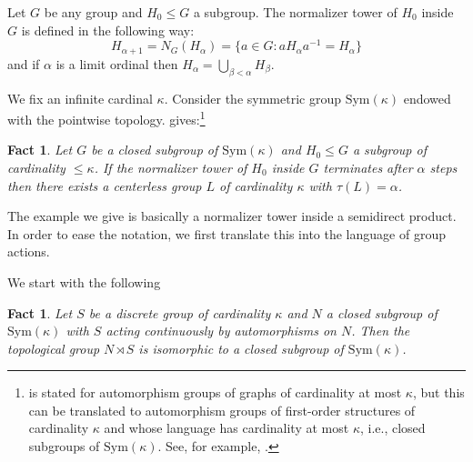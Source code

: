 \documentclass[10pt,a4paper]{amsart}
\theoremstyle{plain}
\newtheorem{fact}[theorem]{Fact}
\theoremstyle{definition}
\newcounter{step}
\begin{document}
Let $G$ be any group and $H_0\leq G$ a subgroup. The normalizer tower of $H_0$ inside $G$ is defined in the following way: \[H_{\alpha+1}=N_G(H_\alpha)=\{a\in G: aH_\alpha a^{-1}=H_\alpha\}\] and if $\alpha$ is a limit ordinal then $H_\alpha=\bigcup_{\beta<\alpha} H_\beta$. 

We fix an infinite cardinal $\kappa$. Consider the symmetric group $\mathrm{Sym}(\kappa)$ endowed with the pointwise topology. 
\cite[Lemma 1.8]{JuShTh} gives:\footnote{\cite[Lemma 1.8]{JuShTh} is stated for automorphism groups of graphs of cardinality at most $\kappa$, but this can be translated to automorphism groups of first-order structures of cardinality $\kappa$ and whose language has cardinality at most $\kappa$, i.e., closed subgroups of $\mathrm{Sym}(\kappa)$. See, for example, \cite[Theorem 4.1.9]{ThomasBook}.}

\begin{fact}\label{F: normalizer to automorphism}
Let $G$ be a closed subgroup of $\mathrm{Sym}(\kappa)$ and $H_0\leq G$ a subgroup of cardinality $\leq \kappa$. If the normalizer tower of $H_0$ inside $G$ terminates after $\alpha$ steps then there exists a  centerless group $L$ of cardinality $\kappa$ with $\tau(L)=\alpha$. 
\end{fact}


The example we give is basically a normalizer tower inside a semidirect product. In order to ease the notation, we first translate this into the language of group actions. 

We start with the following
\begin{fact}\label{F:semidirect of nonarchPolish}
    Let $S$ be a discrete group of cardinality $\kappa$ and $N$ a closed subgroup of $\mathrm{Sym}(\kappa)$ with $S$ acting continuously by automorphisms on $N$. Then the topological group $N\rtimes S$ is isomorphic to a closed subgroup of $\mathrm{Sym}(\kappa)$. 
\end{fact}
\end{document}
